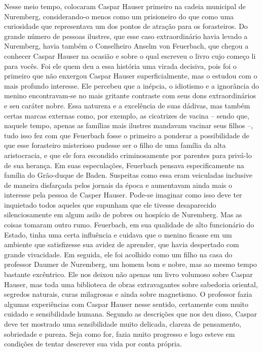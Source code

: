 Nesse meio tempo, colocaram Caspar Hauser primeiro na cadeia municipal
de Nuremberg, considerando-o menos como um prisioneiro do que como uma
curiosidade que representava um dos pontos de atração para os
forasteiros. Do grande número de pessoas ilustres, que esse caso
extraordinário havia levado a Nuremberg, havia também o Conselheiro
Anselm von Feuerbach, que chegou a conhecer Caspar Hauser na ocasião e
sobre o qual escreveu o livro cujo começo li para vocês. Foi ele quem
deu a essa história uma virada decisiva, pois foi o primeiro que não
enxergou Caspar Hauser superficialmente, mas o estudou com o mais
profundo interesse. Ele percebeu que a inépcia, o idiotismo e a
ignorância do menino encontravam-se no mais gritante contraste com seus
dons extraordinários e seu caráter nobre. Essa natureza e a excelência
de suas dádivas, mas também certas marcas externas como, por exemplo, as
cicatrizes de vacina -- sendo que, naquele tempo, apenas as famílias
mais ilustres mandavam vacinar seus filhos --, tudo isso fez com que
Feuerbach fosse o primeiro a ponderar a possibilidade de que esse
forasteiro misterioso pudesse ser o filho de uma família da alta
aristocracia, e que ele fora escondido criminosamente por parentes para
privá-lo de sua herança. Em suas especulações, Feuerbach pensava
especificamente na família do Grão-duque de Baden. Suspeitas como essa eram veiculadas inclusive de maneira disfarçada pelos jornais da época e aumentavam ainda mais o interesse pela pessoa de Casper Hauser. Pode-se imaginar como isso deve ter inquietado todos aqueles que supunham que ele tivesse
desaparecido silenciosamente em algum asilo de pobres ou hospício de
Nuremberg. Mas as coisas tomaram outro rumo. Feuerbach, em sua qualidade
de alto funcionário do Estado, tinha uma certa influência e cuidava que
o menino ficasse em um ambiente que satisfizesse sua avidez de aprender,
que havia despertado com grande vivacidade. Em seguida, ele foi acolhido
como um filho na casa do professor Daumer de Nuremberg, um homem bom e
nobre, mas ao mesmo tempo bastante excêntrico. Ele nos deixou não apenas
um livro volumoso sobre Caspar Hauser, mas toda uma biblioteca de obras
extravagantes sobre sabedoria oriental, segredos naturais, curas
milagrosas e ainda sobre magnetismo. O professor fazia algumas
experiências com Caspar Hauser nesse sentido, certamente com muito
cuidado e sensibilidade humana. Segundo as descrições que nos deu disso,
Caspar deve ter mostrado uma sensibilidade muito delicada, clareza de
pensamento, sobriedade e pureza. Seja como for, fazia muito progresso e
logo esteve em condições de tentar descrever sua vida por conta própria.
